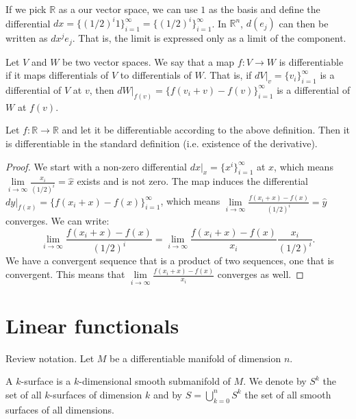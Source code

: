\begin{remark}
	If we pick $\mathbb{R}$ as a our vector space, we can use $1$ as the basis and define the differential $dx=\{(1/2)^i 1\}_{i=1}^{\infty}=\{(1/2)^i\}_{i=1}^{\infty}$. In $\mathbb{R}^n$, $d(e_j)$ can then be written as $dx^j e_j$. That is, the limit is expressed only as a limit of the component.
\end{remark}

\begin{defn}
	Let $V$ and $W$ be two vector spaces. We say that a map $f: V \to W$ is differentiable if it maps differentials of $V$ to differentials of $W$. That is, if $dV|_v=\{v_i\}_{i=1}^{\infty}$ is a differential of $V$ at $v$, then $dW|_{f(v)} = \{f(v_i +v) - f(v)\}_{i=1}^{\infty}$ is a differential of $W$ at $f(v)$.
\end{defn}

\begin{prop}
	Let $f:\mathbb{R} \to \mathbb{R}$ and let it be differentiable according to the above definition. Then it is differentiable in the standard definition (i.e. existence of the derivative).
\end{prop}
\begin{proof}
	We start with a non-zero differential $dx|_x = \{x^i\}_{i=1}^{\infty}$ at $x$, which means $\lim\limits_{i \to \infty} \frac{x_i}{(1/2)^i} = \hat{x}$ exists and is not zero. The map induces the differential $dy|_{f(x)} = \{f(x_i +x) - f(x)\}_{i=1}^{\infty}$, which means $\lim\limits_{i \to \infty} \frac{f(x_i +x) - f(x)}{(1/2)^i} = \hat{y}$ converges. We can write:
	$$ \lim\limits_{i \to \infty} \frac{f(x_i +x) - f(x)}{(1/2)^i} = \lim\limits_{i \to \infty} \frac{f(x_i +x) - f(x)}{x_i}\frac{x_i}{(1/2)^i}.$$
	We have a convergent sequence that is a product of two sequences, one that is convergent. This means that $\lim\limits_{i \to \infty} \frac{f(x_i +x) - f(x)}{x_i}$ converges as well.
\end{proof}

\section{Linear functionals}

Review notation. Let $M$ be a differentiable manifold of dimension $n$.

\begin{defn}
	A $k$-surface is a $k$-dimensional smooth submanifold of $M$. We denote by $S^k$ the set of all  $k$-surfaces of dimension $k$ and by $S = \bigcup_{k=0}^n S^k$ the set of all smooth surfaces of all dimensions.
\end{defn}

